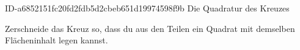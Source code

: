 \begin{exercise}
      {ID-a6852151fc20fd2fdb5d2cbeb651d19974598f9b}
      {Die Quadratur des Kreuzes}
  \ifproblem\problem\par
    Zerschneide das Kreuz so, dass du aus den Teilen ein Quadrat mit demselben
    Flächeninhalt legen kannst.
    \begin{center}
    \end{center}
  \fi
\end{exercise}
